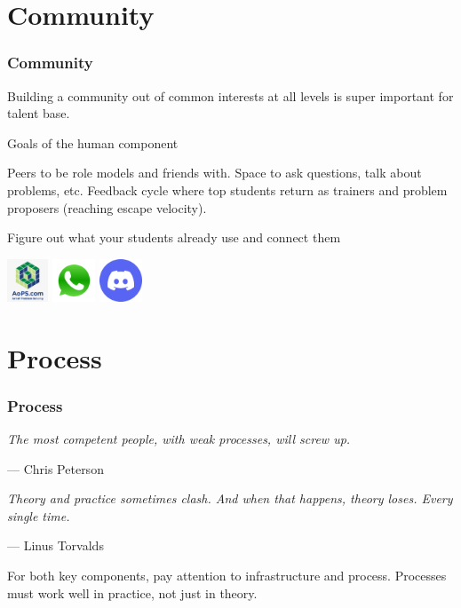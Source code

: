 \documentclass[11pt]{beamer}
\begin{document}
\section{Community}
\begin{frame}
  \frametitle{Community}
  Building a community out of common interests
  at all levels is super important for talent base.
  \begin{block}{Goals of the human component}
  \begin{itemize}
    \ii Peers to be role models and friends with.
    \ii Space to ask questions, talk about problems, etc.
    \ii Feedback cycle where top students return as trainers and problem proposers
    (reaching escape velocity).
  \end{itemize}
  \end{block}
  \pause
  \begin{exampleblock}{Figure out what your students already use and connect them}
    \begin{center}
      \includegraphics[height=0.5in]{logo-aops.png}
      \includegraphics[height=0.5in]{logo-whatsapp.png}
      \includegraphics[height=0.5in]{logo-discord.png}
    \end{center}
  \end{exampleblock}
\end{frame}

\section{Process}
\begin{frame}
  \frametitle{Process}
  \begin{block}{}
    {\slshape
      The most competent people, with weak processes, will screw up.}

    \bigskip \hspace{2em} --- Chris Peterson
  \end{block}
  \begin{block}{}
    {\slshape
      Theory and practice sometimes clash.
      And when that happens, theory loses.
      Every single time.}

    \bigskip \hspace{2em} --- Linus Torvalds
  \end{block}
  For both key components, pay attention to infrastructure and process.
  Processes must work well in practice, not just in theory.
\end{frame}
\end{document}

